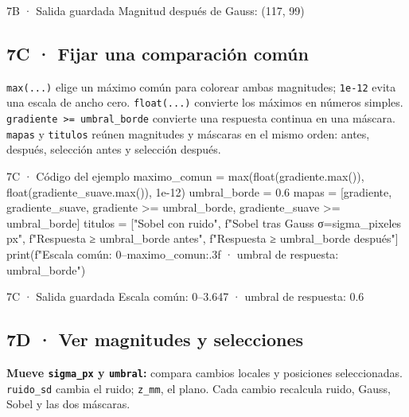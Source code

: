 \begin{Salida}{7B · Salida guardada}
Magnitud después de Gauss: (117, 99)
\end{Salida}



\subsection*{7C · Fijar una comparación común}

\label{vivo:7c}

\texttt{\small max(\allowbreak{}.\allowbreak{}.\allowbreak{}.\allowbreak{})\allowbreak{}} elige un máximo común para colorear ambas magnitudes; \texttt{\small 1e-12} evita una escala de ancho cero. \texttt{\small float(\allowbreak{}.\allowbreak{}.\allowbreak{}.\allowbreak{})\allowbreak{}} convierte los máximos en números simples. \texttt{\small gradiente >= umbral\_borde} convierte una respuesta continua en una máscara. \texttt{\small mapas} y \texttt{\small titulos} reúnen magnitudes y máscaras en el mismo orden: antes, después, selección antes y selección después.

\begin{CodigoVivo}{7C · Código del ejemplo}
maximo_comun = max(float(gradiente.max()), float(gradiente_suave.max()), 1e-12)
umbral_borde = 0.6
mapas = [gradiente, gradiente_suave, gradiente >= umbral_borde, gradiente_suave >= umbral_borde]
titulos = ["Sobel con ruido", f"Sobel tras Gauss σ={sigma_pixeles} px", f"Respuesta ≥ {umbral_borde} antes", f"Respuesta ≥ {umbral_borde} después"]
print(f"Escala común: 0–{maximo_comun:.3f} · umbral de respuesta: {umbral_borde}")
\end{CodigoVivo}


\begin{Salida}{7C · Salida guardada}
Escala común: 0–3.647 · umbral de respuesta: 0.6
\end{Salida}



\subsection*{7D · Ver magnitudes y selecciones}

\label{vivo:7d}

\textbf{Mueve \texttt{\small sigma\_px} y \texttt{\small umbral}:} compara cambios locales y posiciones seleccionadas. \texttt{\small ruido\_sd} cambia el ruido; \texttt{\small z\_mm}, el plano. Cada cambio recalcula ruido, Gauss, Sobel y las dos máscaras.

